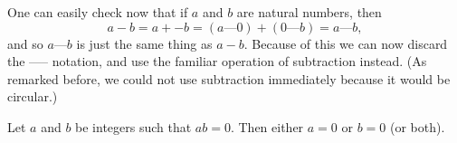 \begin{note}
    One can easily check now that if \(a\) and \(b\) are natural numbers, then
    \[
        a - b = a + -b = (a \text{---} 0) + (0 \text{---} b) = a \text{---} b,
    \]
    and so \(a \text{---} b\) is just the same thing as \(a - b\).
    Because of this we can now discard the ----- notation, and use the familiar operation of subtraction instead.
    (As remarked before, we could not use subtraction immediately because it would be circular.)
\end{note}

\begin{proposition}\label{4.1.8}
    Let \(a\) and \(b\) be integers such that \(ab = 0\).
    Then either \(a = 0\) or \(b = 0\) (or both).
\end{proposition}

